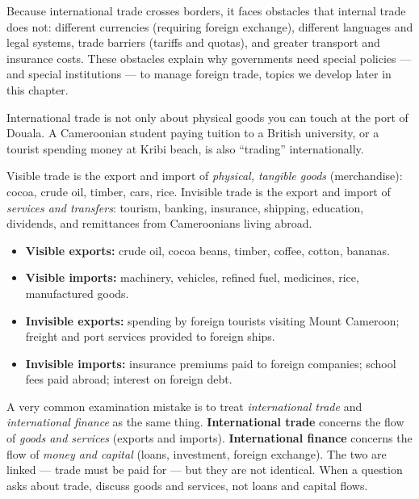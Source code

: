 \documentclass[11pt]{article}
\newcommand{\cle}[1]{{\popxbold\color{popdark}#1}}
\newcounter{popsec}
\newcounter{popsub}
\newcommand{\courssub}[1]{%
  \stepcounter{popsub}%
  \par\vspace{9pt}\noindent{\popxbold\fontsize{11.5}{13}\selectfont\color{popink}{\color{poporange}\thepopsec.\thepopsub}\hspace{6pt}#1}\par\nopagebreak\vspace{4pt}
}
\begin{document}
\begin{attention}
Because international trade crosses borders, it faces obstacles that internal trade does not: different currencies (requiring foreign exchange), different languages and legal systems, trade barriers (tariffs and quotas), and greater transport and insurance costs. These obstacles explain why governments need special policies --- and special institutions --- to manage foreign trade, topics we develop later in this chapter.
\end{attention}

\courssub{Visible and Invisible Trade}

International trade is not only about physical goods you can touch at the port of Douala. A Cameroonian student paying tuition to a British university, or a tourist spending money at Kribi beach, is also ``trading'' internationally.

\begin{definition}
\cle{Visible trade} is the export and import of \emph{physical, tangible goods} (merchandise): cocoa, crude oil, timber, cars, rice. \cle{Invisible trade} is the export and import of \emph{services and transfers}: tourism, banking, insurance, shipping, education, dividends, and remittances from Cameroonians living abroad.
\end{definition}

\begin{exemplebox}
\begin{itemize}
\item \textbf{Visible exports:} crude oil, cocoa beans, timber, coffee, cotton, bananas.
\item \textbf{Visible imports:} machinery, vehicles, refined fuel, medicines, rice, manufactured goods.
\item \textbf{Invisible exports:} spending by foreign tourists visiting Mount Cameroon; freight and port services provided to foreign ships.
\item \textbf{Invisible imports:} insurance premiums paid to foreign companies; school fees paid abroad; interest on foreign debt.
\end{itemize}
\end{exemplebox}

\begin{attention}
A very common examination mistake is to treat \emph{international trade} and \emph{international finance} as the same thing. \textbf{International trade} concerns the flow of \emph{goods and services} (exports and imports). \textbf{International finance} concerns the flow of \emph{money and capital} (loans, investment, foreign exchange). The two are linked --- trade must be paid for --- but they are not identical. When a question asks about trade, discuss goods and services, not loans and capital flows.
\end{attention}
\end{document}

